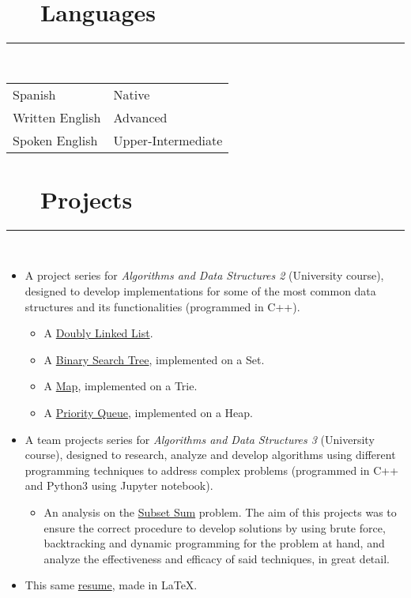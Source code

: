 \documentclass{article}
\begin{document}
\section*{\faLanguage ~~ Languages}
\hrule

\
\newline
\

\begin{tabular}{l | l}
    Spanish & Native \\
    Written English & Advanced \\
    Spoken English & Upper-Intermediate
\end{tabular}

\section*{\faFileCodeO ~~ Projects}
\hrule
\

\begin{itemize}
    \item A project series for \textit{Algorithms and Data Structures 2} (University course), designed to develop implementations for some of the most common data structures and its functionalities (programmed in C++).
    \begin{itemize}
        \item A \href{https://github.com/lucasDS-0/Doubly_Linked_List}{Doubly Linked List}.
        \item A \href{https://github.com/lucasDS-0/BST_on_a_set}{Binary Search Tree}, implemented on a Set.
        \item A \href{https://github.com/lucasDS-0/Map_on_a_trie}{Map}, implemented on a Trie.
        \item A \href{https://github.com/lucasDS-0/Priority_queue_on_a_heap}{Priority Queue}, implemented on a Heap.
    \end{itemize}
    \item A team projects series for \textit{Algorithms and Data Structures 3} (University course), designed to research, analyze and develop algorithms using different programming techniques to address complex problems (programmed in C++ and Python3 using Jupyter notebook).
    \begin{itemize}
        \item An analysis on the \href{https://github.com/lucasDS-0/Subset_sum}{Subset Sum} problem. The aim of this projects was to ensure the correct procedure to develop solutions by using brute force, backtracking and dynamic programming for the problem at hand, and analyze the effectiveness and efficacy of said techniques, in great detail.
    \end{itemize}
    \item This same \href{https://github.com/lucasDS-0/Resume}{resume}, made in \LaTeX.
\end{itemize}
\end{document}
